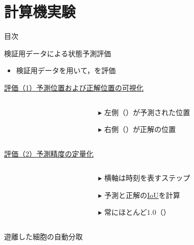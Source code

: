 \section{計算機実験}

\begin{frame}[noframenumbering]{目次}
    \tableofcontents[currentsection]
\end{frame}

\begin{frame}{検証用データによる状態予測評価}
    \begin{itemize}
        \item 検証用データを用いて，を評価
    \end{itemize}
    \vspace{0.5zh}
    \uline{評価（1）予測位置および正解位置の可視化}
    \begin{columns}
        \begin{column}{.6\linewidth}
        \end{column}
        \begin{column}{.4\linewidth}
            \begin{itemize}
                \item[$\blacktriangleright$] 左側（）が予測された位置
                \item[$\blacktriangleright$] 右側（）が正解の位置
            \end{itemize}
        \end{column}
    \end{columns}
    \uline{評価（2）予測精度の定量化}
    \begin{columns}
        \begin{column}{.6\linewidth}
        \end{column}
        \begin{column}{.4\linewidth}
            \vspace{-2.5zh}
            \begin{itemize}
                \item[$\blacktriangleright$] 横軸は時刻を表すステップ
                \item[$\blacktriangleright$] 予測と正解の\uline{IoU}を計算
                \item[$\blacktriangleright$] 常にほとんど$1.0$（）
            \end{itemize}
        \end{column}
    \end{columns}
\end{frame}

\begin{frame}{遊離した細胞の自動分取}
    
\end{frame}
